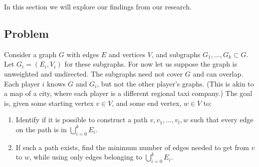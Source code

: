 In this section we will explore our findings from our research.

\subsection{Problem}
Consider a graph $G$ with edges $E$ and vertices $V$, and subgraphs $G_1, \ldots, G_k \subset G$. Let $G_i = (E_i, V_i)$ for these subgraphs. For now let us suppose the graph is unweighted and undirected. The subgraphs need not cover $G$ and can overlap. Each player $i$ knows $G$ and $G_i$, but not the other player's graphs. (This is akin to a map of a city, where each player is a different regional taxi company.) The goal is, given some starting vertex $v \in V$, and some end vertex, $w \in V$ to:
\begin{enumerate}
	\item  Identify if it is possible to construct a path $v, v_1, \dots, v_l, w$ such that every edge on the path is in $\bigcup_{i=0}^{k} E_i$. \label{one}
	\item  If such a path exists, find the minimum number of edges needed to get from $v$ to $w$, while using only edges belonging to $\bigcup_{i=0}^{k} E_i$. \label{two}
\end{enumerate}


